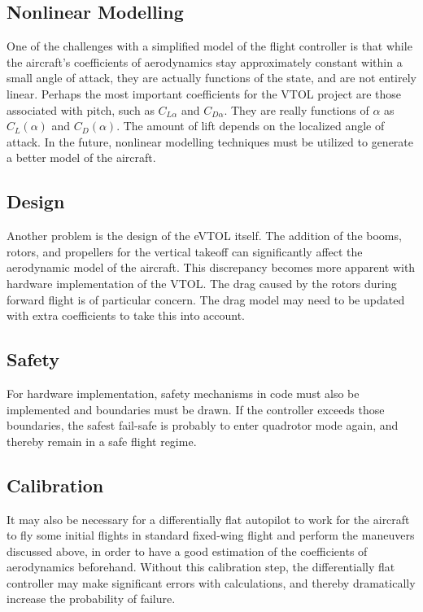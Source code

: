\subsection{Nonlinear Modelling}

One of the challenges with a simplified model of the flight controller is that while the aircraft's coefficients of aerodynamics stay approximately constant within a small angle of attack, they are actually functions of the state, and are not entirely linear. 
Perhaps the most important coefficients for the VTOL project are those associated with pitch, such as $C_{L \alpha}$ and $C_{D \alpha}$. 
They are really functions of $\alpha$ as $C_L(\alpha)$ and $C_D(\alpha)$. 
The amount of lift depends on the localized angle of attack. 
In the future, nonlinear modelling techniques must be utilized to generate a better model of the aircraft.

\subsection{Design}

Another problem is the design of the eVTOL itself. 
The addition of the booms, rotors, and propellers for the vertical takeoff can significantly affect the aerodynamic model of the aircraft. 
This discrepancy becomes more apparent with hardware implementation of the VTOL. 
The drag caused by the rotors during forward flight is of particular concern. 
The drag model may need to be updated with extra coefficients to take this into account.

\subsection{Safety}

For hardware implementation, safety mechanisms in code must also be implemented and boundaries must be drawn.
If the controller exceeds those boundaries, the safest fail-safe is probably to enter quadrotor mode again, and thereby remain in a safe flight regime.

\subsection{Calibration}

It may also be necessary for a differentially flat autopilot to work for the aircraft to fly some initial flights in standard fixed-wing flight and perform the maneuvers discussed above, in order to have a good estimation of the coefficients of aerodynamics beforehand. 
Without this calibration step, the differentially flat controller may make significant errors with calculations, and thereby dramatically increase the probability of failure.

